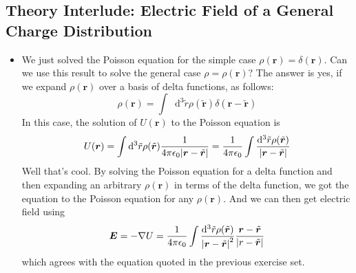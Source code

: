 \documentclass[11pt, a4paper]{article}
\newcommand{\diff}{\mathop{}\!\mathrm{d}} %
\renewcommand{\vec}[1]{\bm{#1}} %
\newcommand{\tvec}[1]{\tilde{\vec{#1}}} %
\renewcommand{\r}{\vec{r}}
\newcommand{\ee}{\epsilon_{0}}  %
\renewcommand{\grad}{\nabla}
\begin{document}
\subsection{Theory Interlude: Electric Field of a General Charge Distribution}
\begin{itemize}
	\item We just solved the Poisson equation for the simple case $ \rho(\r) = \delta(\r) $. Can we use this result to solve the general case $ \rho = \rho(\r) $? The answer is yes, if we expand $ \rho(\r) $ over a basis of delta functions, as follows:
	\begin{equation*}
		\rho(\r) = \int \diff^{3}\tilde{r} \rho(\tvec{r}) \delta(\r - \tvec{r})
	\end{equation*}
	In this case, the solution of $ U(\r) $ to the Poisson equation is
	\begin{equation*}
		U(\r) = \int \diff^{3}\tilde{r}\rho(\tvec{r}) \frac{1}{4\pi \ee\abs{\r - \tvec{r}}} = \frac{1}{4\pi \ee} \int\frac{\diff^{3}\tilde{r}\rho(\tvec{r})}{\abs{\r - \tvec{r}}}
	\end{equation*}
	Well that's cool. By solving the Poisson equation for a delta function and then expanding an arbitrary $ \rho(\r) $ in terms of the delta function, we got the equation to the Poisson equation for any $ \rho(\r) $. And we can then get electric field using
	\begin{equation*}
		\vec{E} = - \grad U = \frac{1}{4\pi \ee} \int\frac{\diff^{3}\tilde{r}\rho(\tvec{r})}{\abs{\r - \tvec{r}}^{2}} \frac{\r - \tvec{r}}{\abs{r - \tvec{r}}}
	\end{equation*}
	which agrees with the equation quoted in the previous exercise set.
\end{itemize}
\end{document}
